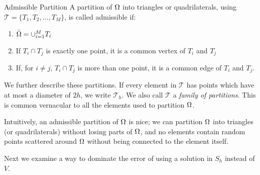 
\begin{defn}{Admissible Partition}
   A partition of $\Omega$ into triangles or quadrilaterals, using 
   $\mathcal{T} = \{T_1, T_2, \ldots, T_M \}$, is called admissible if:~\label{def:admissible_partition}
   \begin{enumerate}
    \item $ \bar{\Omega} = \cup_{i=1}^M T_i$
    \item If $T_i \cap T_j$ is exactly one point, it is a common vertex of 
    $T_i$ and $T_j$
    \item If, for $i\neq j$, $T_i \cap T_j$ is more than one point, it is a 
    common edge of $T_i$ and $T_j$.
   \end{enumerate}
\end{defn}
We further describe these partitions. If every element in $\mathcal{T}$ has points 
which have at most a diameter of $2h$, 
we write $\mathcal{T}_h$. We also call $\mathcal{T}$ a \emph{family of partitions}. 
This is common vernacular to all the elements used to partition $\Omega$. 

Intuitively, an admissible partition of $\Omega$ is nice; we can partition $\Omega$ 
into triangles (or quadrilaterals) without losing parts of $\Omega$, and no 
elements contain random points scattered around $\Omega$ without being connected 
to the element itself.

Next we examine a way to dominate the error of using a solution in $S_h$ instead 
of $V$.